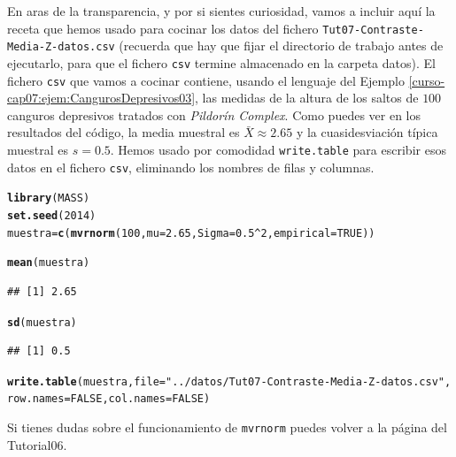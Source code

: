 \documentclass[10pt,a4paper]{article}\usepackage[]{graphicx}\usepackage[]{color}
\makeatletter
\newcommand{\hlnum}[1]{\textcolor[rgb]{0.686,0.059,0.569}{#1}}%
\newcommand{\hlstr}[1]{\textcolor[rgb]{0.192,0.494,0.8}{#1}}%
\newcommand{\hlopt}[1]{\textcolor[rgb]{0,0,0}{#1}}%
\newcommand{\hlstd}[1]{\textcolor[rgb]{0.345,0.345,0.345}{#1}}%
\newcommand{\hlkwb}[1]{\textcolor[rgb]{0.69,0.353,0.396}{#1}}%
\newcommand{\hlkwc}[1]{\textcolor[rgb]{0.333,0.667,0.333}{#1}}%
\newcommand{\hlkwd}[1]{\textcolor[rgb]{0.737,0.353,0.396}{\textbf{#1}}}%
\newenvironment{kframe}{%
 \def\at@end@of@kframe{}%
 \ifinner\ifhmode%
  \def\at@end@of@kframe{\end{minipage}}%
  \begin{minipage}{\columnwidth}%
 \fi\fi%
 \def\FrameCommand##1{\hskip\@totalleftmargin \hskip-\fboxsep
 \colorbox{shadecolor}{##1}\hskip-\fboxsep
     \hskip-\linewidth \hskip-\@totalleftmargin \hskip\columnwidth}%
 \MakeFramed {\advance\hsize-\width
   \@totalleftmargin\z@ \linewidth\hsize
   \@setminipage}}%
 {\par\unskip\endMakeFramed%
 \at@end@of@kframe}
\newenvironment{knitrout}{}{} %
\newcounter {cont01}
\makeatother
\begin{document}
En aras de la transparencia, y por si sientes curiosidad, vamos a incluir aquí la receta que hemos usado para cocinar los datos del fichero {\tt Tut07-Contraste-Media-Z-datos.csv} (recuerda que hay que fijar el directorio de trabajo antes de ejecutarlo, para que el fichero {\tt csv} termine almacenado en la carpeta {\sf datos}). El fichero {\tt csv} que vamos a cocinar contiene, usando el lenguaje del Ejemplo \ref{curso-cap07:ejem:CangurosDepresivos03}, las medidas de la altura de los saltos de $100$ canguros depresivos tratados con {\em Pildorín Complex}. Como puedes ver en los resultados del código, la media muestral es $\bar X\approx 2.65$ y la cuasidesviación típica muestral es $s=0.5$. Hemos usado por comodidad {\tt write.table} para escribir esos datos en el fichero {\tt csv}, eliminando los nombres de filas y columnas.
\begin{knitrout}
\color{fgcolor}\begin{kframe}
\begin{alltt}
\hlkwd{library}\hlstd{(MASS)}
\hlkwd{set.seed}\hlstd{(}\hlnum{2014}\hlstd{)}
\hlstd{muestra} \hlkwb{=} \hlkwd{c}\hlstd{(}\hlkwd{mvrnorm}\hlstd{(}\hlnum{100}\hlstd{,} \hlkwc{mu} \hlstd{=} \hlnum{2.65}\hlstd{,} \hlkwc{Sigma} \hlstd{=} \hlnum{0.5}\hlopt{^}\hlnum{2}\hlstd{,} \hlkwc{empirical} \hlstd{=} \hlnum{TRUE}\hlstd{))}

\hlkwd{mean}\hlstd{(muestra)}
\end{alltt}
\begin{verbatim}
## [1] 2.65
\end{verbatim}
\begin{alltt}
\hlkwd{sd}\hlstd{(muestra)}
\end{alltt}
\begin{verbatim}
## [1] 0.5
\end{verbatim}
\begin{alltt}
\hlkwd{write.table}\hlstd{(muestra,} \hlkwc{file} \hlstd{=} \hlstr{"../datos/Tut07-Contraste-Media-Z-datos.csv"}\hlstd{,}
        \hlkwc{row.names} \hlstd{=} \hlnum{FALSE}\hlstd{,} \hlkwc{col.names}\hlstd{=}\hlnum{FALSE} \hlstd{)}
\end{alltt}
\end{kframe}
\end{knitrout}
Si tienes dudas sobre el funcionamiento de {\tt mvrnorm} puedes volver a la página \pageref{tut06-tut06:subsubsec:CocinandoMuestras} del Tutorial06.

\end{document}
